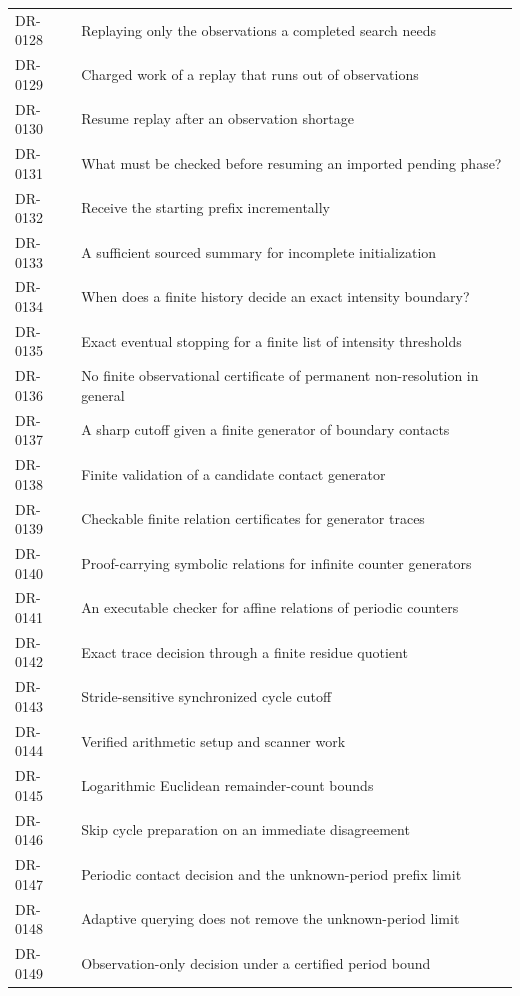 \begin{longtable}{p{.14\linewidth}p{.79\linewidth}}
DR-0128 & Replaying only the observations a completed search needs\\
DR-0129 & Charged work of a replay that runs out of observations\\
DR-0130 & Resume replay after an observation shortage\\
DR-0131 & What must be checked before resuming an imported pending phase?\\
DR-0132 & Receive the starting prefix incrementally\\
DR-0133 & A sufficient sourced summary for incomplete initialization\\
DR-0134 & When does a finite history decide an exact intensity boundary?\\
DR-0135 & Exact eventual stopping for a finite list of intensity thresholds\\
DR-0136 & No finite observational certificate of permanent non-resolution in general\\
DR-0137 & A sharp cutoff given a finite generator of boundary contacts\\
DR-0138 & Finite validation of a candidate contact generator\\
DR-0139 & Checkable finite relation certificates for generator traces\\
DR-0140 & Proof-carrying symbolic relations for infinite counter generators\\
DR-0141 & An executable checker for affine relations of periodic counters\\
DR-0142 & Exact trace decision through a finite residue quotient\\
DR-0143 & Stride-sensitive synchronized cycle cutoff\\
DR-0144 & Verified arithmetic setup and scanner work\\
DR-0145 & Logarithmic Euclidean remainder-count bounds\\
DR-0146 & Skip cycle preparation on an immediate disagreement\\
DR-0147 & Periodic contact decision and the unknown-period prefix limit\\
DR-0148 & Adaptive querying does not remove the unknown-period limit\\
DR-0149 & Observation-only decision under a certified period bound\\
\bottomrule
\end{longtable}
\normalsize
